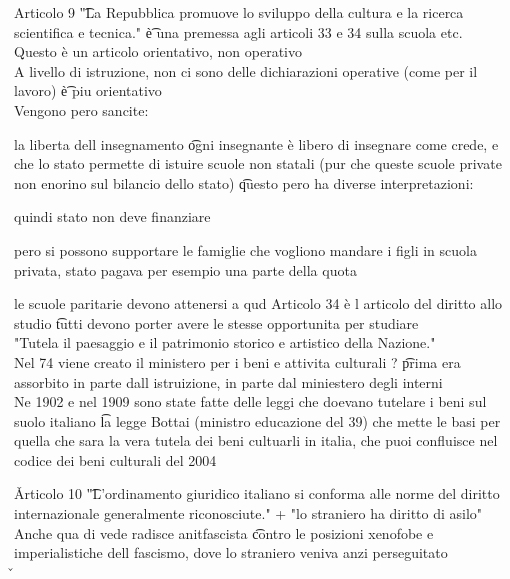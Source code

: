 \documentclass[12pt]{article}
\begin{document}
Articolo 9 \t "La Repubblica promuove lo sviluppo della cultura e la ricerca scientifica e tecnica." \t è una premessa agli articoli 33 e 34 sulla scuola etc. \\
Questo è un articolo orientativo, non operativo \\
A livello di istruzione, non ci sono delle dichiarazioni operative (come per il lavoro) \t è piu orientativo \\
Vengono pero sancite:
\bi
  \item la liberta dell insegnamento \t ogni insegnante è libero di insegnare come crede, e che lo stato permette di istuire scuole non statali (pur che queste scuole private non enorino sul bilancio dello stato) \t questo pero ha diverse interpretazioni:
    \bi
      \item quindi stato non deve finanziare
      \item pero si possono supportare le famiglie che vogliono mandare i figli in scuola privata, stato pagava per esempio una parte della quota
    \ei
  \item le scuole paritarie devono attenersi a qud
\ei
Articolo 34 è l articolo del diritto allo studio \t tutti devono porter avere le stesse opportunita per studiare \\
"Tutela il paesaggio e il patrimonio storico e artistico della Nazione." \\
Nel 74 viene creato il ministero per i beni e attivita culturali ? \t prima era assorbito in parte dall istruizione, in parte dal miniestero degli interni \\
Ne 1902 e nel 1909 sono state fatte delle leggi che doevano tutelare i beni sul suolo italiano \t la legge Bottai (ministro educazione del 39) che mette le basi per quella che sara la vera tutela dei beni cultuarli in italia, che puoi confluisce nel codice dei beni culturali del 2004

\v

Articolo 10 \t "L'ordinamento giuridico italiano si conforma alle norme del diritto internazionale generalmente riconosciute." + "lo straniero ha diritto di asilo" \\
Anche qua di vede radisce anitfascista \t contro le posizioni xenofobe e imperialistiche dell fascismo, dove lo straniero veniva anzi perseguitato \\

\v
\end{document}
